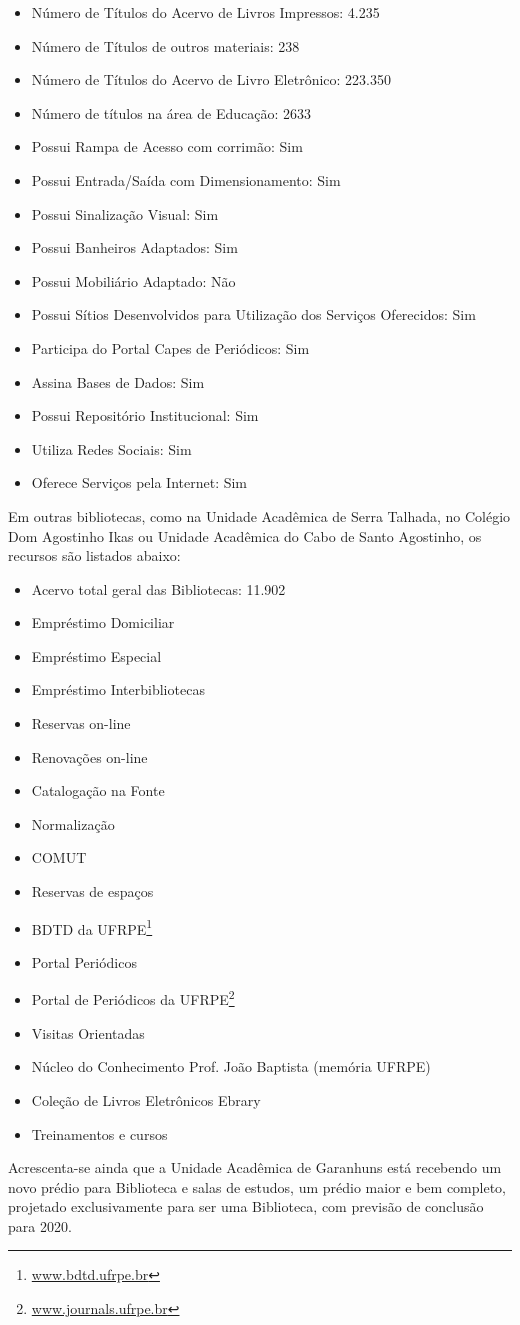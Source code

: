 \documentclass[
	12pt,				%
	openright,			%
  oneside,     %
	a4paper,			%
	chapter=TITLE,		%
	english,			%
	french,				%
	spanish,			%
	brazil				%
	]{abntex2}
\begin{document}
\begin{itemize}
    \item Número de Títulos do Acervo de Livros Impressos: 4.235
    \item Número de Títulos de outros materiais: 238
    \item Número de Títulos do Acervo de Livro Eletrônico: 223.350
    \item Número de títulos na área de Educação: 2633
    \item Possui Rampa de Acesso com corrimão: Sim
    \item Possui Entrada/Saída com Dimensionamento: Sim
    \item Possui Sinalização Visual: Sim
    \item Possui Banheiros Adaptados: Sim
    \item Possui Mobiliário Adaptado: Não
    \item Possui Sítios Desenvolvidos para Utilização dos Serviços Oferecidos: Sim
    \item Participa do Portal Capes de Periódicos: Sim
    \item Assina Bases de Dados: Sim
    \item Possui Repositório Institucional: Sim
    \item Utiliza Redes Sociais: Sim
    \item Oferece Serviços pela Internet: Sim
\end{itemize}

Em outras bibliotecas, como na Unidade Acadêmica de Serra Talhada, no Colégio Dom Agostinho Ikas ou Unidade Acadêmica do Cabo de Santo Agostinho, os recursos são listados abaixo:

\begin{itemize}
    \item Acervo total geral das Bibliotecas: 11.902
    \item Empréstimo Domiciliar
    \item Empréstimo Especial
    \item Empréstimo Interbibliotecas
    \item Reservas on-line
    \item Renovações on-line
    \item Catalogação na Fonte
    \item Normalização
    \item COMUT
    \item Reservas de espaços
    \item BDTD da UFRPE\footnote{\url{www.bdtd.ufrpe.br}}
    \item Portal Periódicos
    \item Portal de Periódicos da UFRPE\footnote{\url{www.journals.ufrpe.br}}
    \item Visitas Orientadas
    \item Núcleo do Conhecimento Prof. João Baptista (memória UFRPE)
    \item Coleção de Livros Eletrônicos Ebrary
    \item Treinamentos e cursos
\end{itemize}

Acrescenta-se ainda que a Unidade Acadêmica de Garanhuns está recebendo um novo prédio para Biblioteca e salas de estudos, um prédio maior e bem completo, projetado exclusivamente para ser uma Biblioteca, com previsão de conclusão para 2020.




\end{document}
